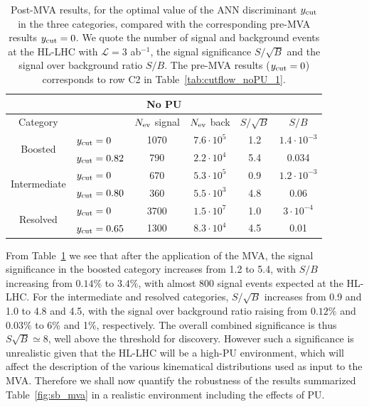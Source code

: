 \begin{table}[t]
  \centering
  \begin{tabular}{|c|l|c|c|c|c|}
    \hline
    \multicolumn{6}{|c|}{No PU} \\
    \hline
    \hline
    Category  &   &  $N_{\rm ev}$ signal &  $N_{\rm ev}$ back  &  $S/\sqrt{B}$ & $S/B$ \\ 
    \hline
    \hline
    \multirow{2}{*}{Boosted} &  $y_{\rm cut}=0$  & 1070 & $7.6\cdot 10^5$  & 1.2  & $1.4\cdot 10^{-3}$  \\
    &  $y_{\rm cut}=0.82$ & 790  & $2.2\cdot 10^4$   & 5.4  & 0.034 \\
    \hline
    \hline
    \multirow{2}{*}{Intermediate} &  $y_{\rm cut}=0$  & 670   & $5.3\cdot 10^5$
    & 0.9 & $1.2\cdot 10^{-3}$ \\
    &  $y_{\rm cut}=0.80$ & 360  & $5.5\cdot 10^3$  & 4.8 & 0.06\\
    \hline
    \hline
      \multirow{2}{*}{Resolved} &  $y_{\rm cut}=0$  & 3700 &  $1.5\cdot 10^{7}$ &  1.0 &$3\cdot 10^{-4}$ \\
    &  $y_{\rm cut}=0.65$ & 1300  & $8.3\cdot 10^{4}$ & 4.5 & 0.01 \\
    \hline
      \end{tabular}
  \caption{\small Post-MVA results, for the optimal value of the
    ANN discriminant $y_{\rm cut}$ in the three categories, compared with the
    corresponding
    pre-MVA results $y_{\rm cut}=0$.
    We quote the number of signal and
    background events
    at the HL-LHC with $\mathcal{L}=3$ ab$^{-1}$,
    the signal significance $S/\sqrt{B}$ and
    the signal over background ratio $S/B$.
    The pre-MVA results ($y_{\rm cut}=0$) corresponds to row C2 in
    Table~\ref{tab:cutflow_noPU_1}.
    \label{table:cutflowMVA}
  }
\end{table}




From Table~\ref{table:cutflowMVA} we see that
after the application of the MVA, 
the signal significance in the boosted category increases
from 1.2 to 5.4, with $S/B$ increasing from $0.14\%$ to $3.4\%$,
with almost 800 signal events expected at the HL-LHC.
%
For the intermediate and resolved categories, $S/\sqrt{B}$
increases from 0.9 and 1.0 to 4.8 and 4.5, with
the signal over background ratio raising from
$0.12\%$ and $0.03\%$ to 6\% and 1\%, respectively.
%
The overall combined significance is thus $S\sqrt{B}\simeq 8$,
well above the threshold for discovery. However such a significance
is unrealistic given that the HL-LHC will be a high-PU environment,
which will affect the description of the various
kinematical distributions used as input to the MVA.
%
Therefore we shall now quantify the robustness of the
results summarized Table~\ref{fig:sb_mva}
in a realistic environment including the effects of PU.

